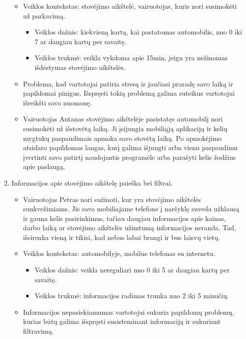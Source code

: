 \documentclass{VUMIFPSkursinis}
\begin{document}
\begin{enumerate}[label = \textbf{PV\arabic*.}]
\begin{itemize}[label={-}]
			\item Veiklos kontekstas: stovėjimo aikštelė, vairuotojas, kuris nori susimokėti už parkavimą.
				\begin{itemize}[label={$\bullet$}]
					\item Veiklos dažnis: kiekvieną kartą, kai pastatomas automobilis, nuo 0 iki 7 ar daugiau kartų per savaitę. 
					\item Veiklos trukmė: veikla vykdoma apie 15min, jeigu yra nežinomas išdėstymas stovėjimo aikštelės.
				\end{itemize}
			\item Problema, kad vartotojai patiria stresą ir jaučiasi praradę savo laiką ir papildomai pinigus. Išspręsti tokią problemą galima suteikus vartotojui išreikšti savo nuomonę.

			\item Vairuotojas Antanas stovėjimo aikštelėje pasistatęs automobilį nori susimokėti už išstovėtą laiką. Ji įsijungia mobiliąją aplikaciją ir kelių mygtukų paspaudimais apmoka savo stovėtą laiką. Po apmokėjimo atsidaro papildomas langas, kurį galima išjungti arba vienu paspaudimu įvertinti savo patirtį naudojantis programėle arba parašyti kelis žodžius apie paslaugą.
			
		\end{itemize}
	\item Informacijos apie stovėjimo aikštelę paieška bei filtrai.
		\begin{itemize}[label={-}]
			\item Vairuotojas Petras nori sužinoti, kur yra stovėjimo aikštelės sunkvežimiams. Jis savo mobiliajame telefone į naršyklę suveda užklausą ir gauna kelis pasirinkimus, tačiau daugiau informacijos apie kainas, darbo laiką ar stovėjimo aikštelės užimtumą informacijos neranda. Tad, išsirenka vieną ir tikisi, kad nebus labai brangi ir bus laisvų vietų.

			\item Veiklos kontekstas: automobilyje, mobilus telefonas su internetu.
				\begin{itemize}[label={$\bullet$}]
					\item Veiklos dažnis: veikla nereguliari nuo 0 iki 5 ar daugiau kartų per savaitę.
					\item Veiklos trukmė: informacijos radimas trunka nuo 2 iki 5 minučių.
				\end{itemize}
			\item Informacijos nepasiekiamumas vartotojui sukuria papildomų problemų, kurias būtų galima išspręsti susisteminant informaciją ir sukuriant filtravimą.


\end{itemize}
\end{enumerate}
\end{document}
